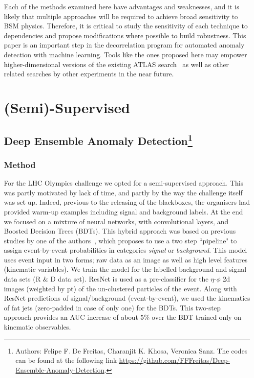 \documentclass[a4paper,11pt]{article}
\begin{document}
Each of the methods examined here have advantages and weaknesses, and it is likely that multiple approaches will be required to achieve broad sensitivity to BSM physics.  Therefore, it is critical to study the sensitivity of each technique to dependencies and propose modifications where possible to build robustness.  This paper is an important step in the decorrelation program for automated anomaly detection with machine learning.  Tools like the ones proposed here may empower higher-dimensional versions of the existing ATLAS search~\cite{collaboration2020dijet} as well as other related searches by other experiments in the near future.


 \FloatBarrier

\section{(Semi)-Supervised}
\label{sec:supervised}


\subsection[Deep Ensemble Anomaly Detection]{Deep Ensemble Anomaly Detection\footnote{Authors: Felipe F. De Freitas, Charanjit K. Khosa, Veronica Sanz.  The codes can be found at the following link \url{https://github.com/FFFreitas/Deep-Ensemble-Anomaly-Detection}.}}

\label{sec:CNNBDT}

\subsubsection{Method}
\label{sec:method}
For the LHC Olympics challenge we opted for a semi-supervised approach. This was partly motivated by lack of time, and partly by the way the challenge itself was set up. Indeed, previous to the releasing of the blackboxes, the organisers had provided warm-up examples including signal and background labels. 
At the end we focused on a mixture of neural networks, with convolutional layers, and Boosted Decision Trees (BDTs). This hybrid approach was based on previous studies by one of the authors~\cite{Alves:2019ppy}, which proposes to use a two step ``pipeline" to assign event-by-event probabilities in categories {\it signal} or {\it background}.  This model uses event input in two forms; raw data as an image as well as high level features (kinematic variables). We train the model for the labelled background and signal data sets (R $\&$ D data set). ResNet is used as a pre-classifier for the $\eta$-$\phi$ 2d images (weighted by pt) of the un-clustered particles of the event. Along with ResNet predictions of signal/background (event-by-event), we used the kinematics of fat jets (zero-padded in case of only one) for the BDTs.  This two-step approach provides an AUC increase of about  5$\%$  over the BDT trained only on kinematic observables. 
\end{document}
